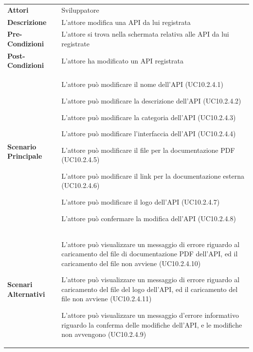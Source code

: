 \begin{minipage}{\linewidth}
	\begin{tabular}{ l | p{11cm}}
		\hline
		\rowcolor{Gray}
		\multicolumn{2}{c}{UC10.2.4 - Modifica API registrata} \\
		\hline
		\textbf{Attori} & Sviluppatore \\
		\textbf{Descrizione} & L'attore modifica una API da lui registrata \\
		\textbf{Pre-Condizioni} & L'attore si trova nella schermata relativa alle API da lui registrate \\
		\textbf{Post-Condizioni} & L'attore ha modificato un API registrata \\
		\textbf{Scenario Principale} & 
		\begin{enumerate*}[label=(\arabic*.),itemjoin={\newline}]
			\item L'attore può modificare il nome dell'API (UC10.2.4.1)
			\item L'attore può modificare la descrizione dell'API (UC10.2.4.2)
			\item L'attore può modificare la categoria dell'API (UC10.2.4.3)
			\item L'attore può modificare l'interfaccia dell'API (UC10.2.4.4)
			\item L'attore può modificare il file per la documentazione PDF (UC10.2.4.5)
			\item L'attore può modificare il link per la documentazione esterna (UC10.2.4.6)
			\item L'attore può modificare il logo dell'API (UC10.2.4.7)
			\item L'attore può confermare la modifica dell'API (UC10.2.4.8)
		\end{enumerate*}\\
		\textbf{Scenari Alternativi} & 
		\begin{enumerate*}[label=(\arabic*.),itemjoin={\newline}]
			\item L'attore può visualizzare un messaggio di errore riguardo al caricamento del file di documentazione PDF dell'API, ed il caricamento del file non avviene (UC10.2.4.10)
			\item L'attore può visualizzare un messaggio di errore riguardo al caricamento del file del logo dell'API, ed il caricamento del file non avviene (UC10.2.4.11)
			\item L'attore può visualizzare un messaggio d'errore informativo riguardo la conferma delle modifiche dell'API, e le modifiche non avvengono (UC10.2.4.9)
		\end{enumerate*}\\
	\end{tabular}
\end{minipage}


